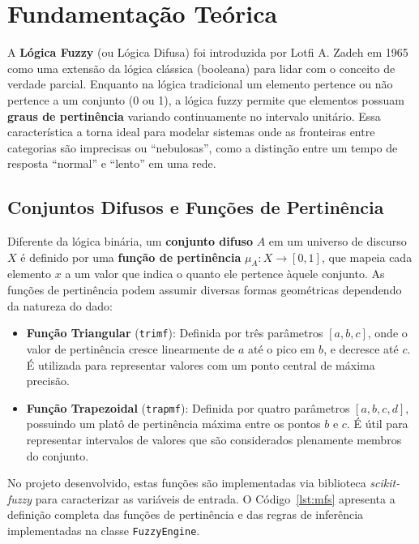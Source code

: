 \section{Fundamentação Teórica}

A \textbf{Lógica Fuzzy} (ou Lógica Difusa) foi introduzida por Lotfi A. Zadeh em 1965 como uma extensão da lógica clássica (booleana) para lidar com o conceito de verdade parcial. Enquanto na lógica tradicional um elemento pertence ou não pertence a um conjunto (0 ou 1), a lógica fuzzy permite que elementos possuam \textbf{graus de pertinência} variando continuamente no intervalo unitário. Essa característica a torna ideal para modelar sistemas onde as fronteiras entre categorias são imprecisas ou ``nebulosas'', como a distinção entre um tempo de resposta ``normal'' e ``lento'' em uma rede.

\subsection{Conjuntos Difusos e Funções de Pertinência}

Diferente da lógica binária, um \textbf{conjunto difuso} $A$ em um universo de discurso $X$ é definido por uma \textbf{função de pertinência} $\mu_A: X \to [0,1]$, que mapeia cada elemento $x$ a um valor que indica o quanto ele pertence àquele conjunto. As funções de pertinência podem assumir diversas formas geométricas dependendo da natureza do dado:

\begin{itemize}
    \item \textbf{Função Triangular} (\texttt{trimf}): Definida por três parâmetros $[a,b,c]$, onde o valor de pertinência cresce linearmente de $a$ até o pico em $b$, e decresce até $c$. É utilizada para representar valores com um ponto central de máxima precisão.
    \item \textbf{Função Trapezoidal} (\texttt{trapmf}): Definida por quatro parâmetros $[a,b,c,d]$, possuindo um platô de pertinência máxima entre os pontos $b$ e $c$. É útil para representar intervalos de valores que são considerados plenamente membros do conjunto.
\end{itemize}

No projeto desenvolvido, estas funções são implementadas via biblioteca \textit{scikit-fuzzy} \cite{scikitfuzzy} para caracterizar as variáveis de entrada. O Código~\ref{lst:mfs} apresenta a definição completa das funções de pertinência e das regras de inferência implementadas na classe \texttt{FuzzyEngine}.

